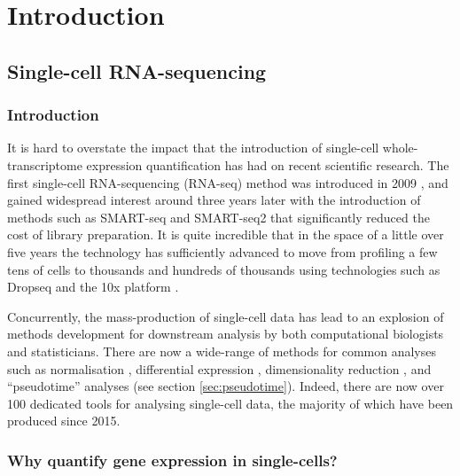 \chapter{Introduction}\label{ch:introduction}

\section{Single-cell RNA-sequencing}

\subsection{Introduction}

It is hard to overstate the impact that the introduction of single-cell whole-transcriptome expression quantification has had on recent scientific research. The first single-cell RNA-sequencing (RNA-seq) method was introduced in 2009 \cite{Tang2009-th}, and gained widespread interest around three years later with the introduction of methods such as SMART-seq \cite{Ramskold2012-wt} and SMART-seq2 \cite{Picelli2013-tm} that significantly reduced the cost of library preparation. It is quite incredible that in the space of a little over five years the technology has sufficiently advanced to move from profiling a few tens of cells to thousands and hundreds of thousands using technologies such as Dropseq \cite{Macosko2015-ek} and the 10x platform \cite{Zheng2017-vj}.

Concurrently, the mass-production of single-cell data has lead to an explosion of methods development for downstream analysis by both computational biologists and statisticians. There are now a wide-range of methods for common analyses such as normalisation \cite{Lun2016-oj,Bacher2017-ga}, differential expression \cite{Kharchenko2014,Delmans2016-po,Korthauer2016-iz}, dimensionality reduction \cite{Yau2015,Wang2017-dl}, and ``pseudotime'' analyses (see section \ref{sec:pseudotime}). Indeed, there are now over 100 dedicated tools for analysing single-cell data, %
the majority of which have been produced since 2015.

\subsection{Why quantify gene expression in single-cells?}

